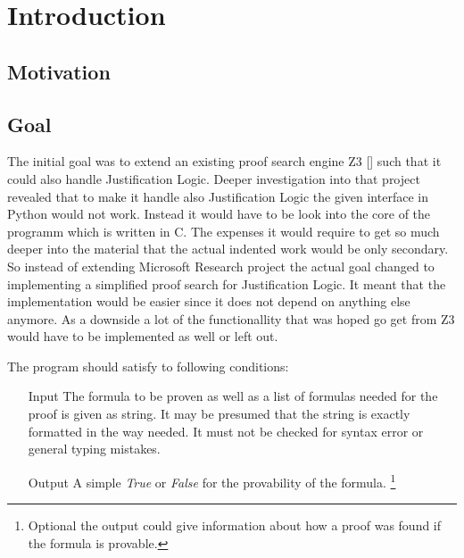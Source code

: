\chapter{Introduction}

\section{Motivation}

\section{Goal}
\par
The initial goal was to extend an existing proof search engine Z3 [\cite{z3}] such that it could also handle Justification Logic. Deeper investigation into that project revealed that to make it handle also Justification Logic the given interface in Python would not work. Instead it would have to be look into the core of the programm which is written in C. The expenses it would require to get so much deeper into the material that the actual indented work would be only secondary.
So instead of extending Microsoft Research project the actual goal changed to implementing a simplified proof search for Justification Logic. It meant that the implementation would be easier since it does not depend on anything else anymore. As a downside a lot of the functionallity that was hoped go get from Z3 would have to be implemented as well or left out.

\par The program should satisfy to following conditions:

\begin{itemize}
	\item[Input] The formula to be proven as well as a list of formulas needed for the proof is given as string. It may be presumed that the string is exactly formatted in the way needed. It must not be checked for syntax error or general typing mistakes.
	\item[Output] A simple \emph{True} or \emph{False} for the provability of the formula. \footnote{Optional the output could give information about how a proof was found if the formula is provable.}
\end{itemize}

